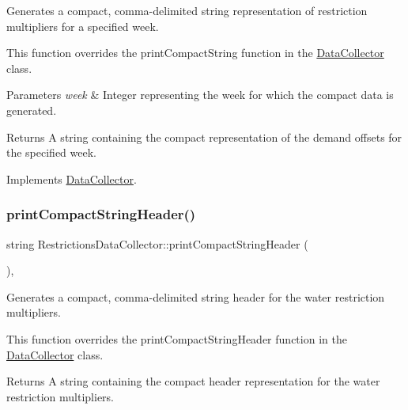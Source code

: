 Generates a compact, comma-\/delimited string representation of restriction multipliers for a specified week. 

This function overrides the {\ttfamily print\+Compact\+String} function in the {\ttfamily \mbox{\hyperlink{classDataCollector}{Data\+Collector}}} class.


\begin{DoxyParams}{Parameters}
{\em week} & Integer representing the week for which the compact data is generated.\\
\hline
\end{DoxyParams}
\begin{DoxyReturn}{Returns}
A string containing the compact representation of the demand offsets for the specified week. 
\end{DoxyReturn}


Implements \mbox{\hyperlink{classDataCollector_a2eac264fa5612aed5a830b12de4f4ae3}{Data\+Collector}}.

\mbox{\label{classRestrictionsDataCollector_ad36ff12a666d72c92893c918715628f6}} 
\subsubsection{\texorpdfstring{print\+Compact\+String\+Header()}{printCompactStringHeader()}}
{\footnotesize\ttfamily string Restrictions\+Data\+Collector\+::print\+Compact\+String\+Header (\begin{DoxyParamCaption}{ }\end{DoxyParamCaption})\hspace{0.3cm}{\ttfamily [override]}, {\ttfamily [virtual]}}



Generates a compact, comma-\/delimited string header for the water restriction multipliers. 

This function overrides the {\ttfamily print\+Compact\+String\+Header} function in the {\ttfamily \mbox{\hyperlink{classDataCollector}{Data\+Collector}}} class.

\begin{DoxyReturn}{Returns}
A string containing the compact header representation for the water restriction multipliers. 
\end{DoxyReturn}


